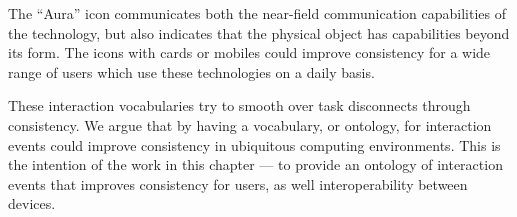 The ``Aura'' icon communicates both the near-field communication capabilities of the technology, but also indicates that the physical object has capabilities beyond its form. The icons with cards or mobiles could improve consistency for a wide range of users which use these technologies on a daily basis.

These interaction vocabularies try to smooth over task disconnects through consistency. We argue that by having a vocabulary, or ontology, for interaction events could improve consistency in ubiquitous computing environments. This is the intention of the work in this chapter --- to provide an ontology of interaction events that improves consistency for users, as well interoperability between devices.











% 
% 
